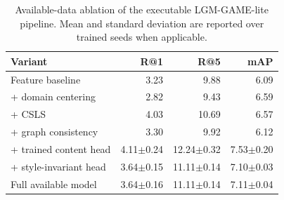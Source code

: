 \begin{table}[!t]
\centering
\footnotesize
\caption{Available-data ablation of the executable LGM-GAME-lite pipeline. Mean and standard deviation are reported over trained seeds when applicable.}
\label{tab:publication_ablation}
\begin{tabular}{lrrr}
\toprule
Variant & R@1 & R@5 & mAP \\
\midrule
Feature baseline & 3.23 & 9.88 & 6.09 \\
+ domain centering & 2.82 & 9.43 & 6.59 \\
+ CSLS & 4.03 & 10.69 & 6.57 \\
+ graph consistency & 3.30 & 9.92 & 6.12 \\
+ trained content head & 4.11$\pm$0.24 & 12.24$\pm$0.32 & 7.53$\pm$0.20 \\
+ style-invariant head & 3.64$\pm$0.15 & 11.11$\pm$0.14 & 7.10$\pm$0.03 \\
Full available model & 3.64$\pm$0.16 & 11.11$\pm$0.14 & 7.11$\pm$0.04 \\
\bottomrule
\end{tabular}
\end{table}
